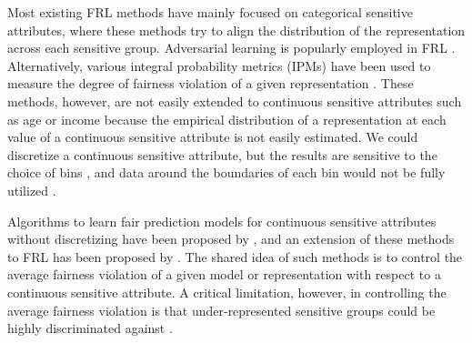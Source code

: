 \documentclass{article} %
\begin{document}
Most existing FRL methods have mainly focused on categorical sensitive attributes,
where these methods try to align the distribution of the representation across each sensitive group.
Adversarial learning is popularly employed in FRL \citep{edwards2015censoring,beutel2017data,zhang2018mitigating,madras2018learning}. Alternatively, 
various integral probability metrics (IPMs) have been used to measure the degree of fairness violation of a given representation
\citep{louizos2015variational,kim2022learning,deka2023mmd}. These methods, however,
are not easily extended to continuous sensitive attributes such as age or income
because the empirical distribution of a representation at each value of a continuous sensitive attribute
is not easily estimated. We could discretize a continuous sensitive attribute, but 
the results are sensitive to the choice of bins \citep{kong2025fair}, and 
data around the boundaries of each bin
would not be fully utilized \citep{mary2019fairness}.

Algorithms to learn fair prediction models for continuous sensitive attributes without discretizing 
have been proposed by \citet{mary2019fairness,grari2019fairness,grari2021learning,jiang2022generalized,sohn2024fair}, and
an extension of these methods to FRL has been proposed by \citet{kong2025fair}. The shared idea of such methods
is to control the average fairness violation of a given model or representation with respect to 
a continuous sensitive attribute. 
A critical limitation, however, in controlling the average fairness violation is that  under-represented sensitive groups could be highly discriminated against \citep{kearns2018preventing, hashimoto2018fairness}.
\end{document}
